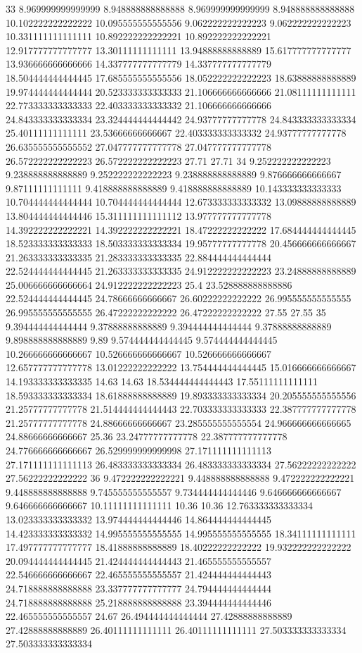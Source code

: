 33 8.969999999999999 8.948888888888888 8.969999999999999 8.948888888888888 10.102222222222222 10.095555555555556 9.062222222222223 9.062222222222223 10.331111111111111 10.892222222222221 10.892222222222221 12.917777777777777 13.30111111111111 13.94888888888889 15.617777777777777 13.936666666666666 14.337777777777779 14.337777777777779 18.504444444444445 17.685555555555556 18.052222222222223 18.63888888888889 19.974444444444444 20.523333333333333 21.106666666666666 21.08111111111111 22.773333333333333 22.403333333333332 21.106666666666666 24.843333333333334 23.324444444444442 24.93777777777778 24.843333333333334 25.40111111111111 23.53666666666667 22.403333333333332 24.93777777777778 26.635555555555552 27.047777777777778 27.047777777777778 26.572222222222223 26.572222222222223 27.71 27.71
34 9.252222222222223 9.238888888888889 9.252222222222223 9.238888888888889 9.876666666666667 9.87111111111111 9.418888888888889 9.418888888888889 10.143333333333333 10.704444444444444 10.704444444444444 12.673333333333332 13.09888888888889 13.804444444444446 15.311111111111112 13.977777777777778 14.392222222222221 14.392222222222221 18.47222222222222 17.684444444444445 18.523333333333333 18.503333333333334 19.95777777777778 20.456666666666667 21.263333333333335 21.283333333333335 22.884444444444444 22.524444444444445 21.263333333333335 24.912222222222223 23.24888888888889 25.006666666666664 24.912222222222223 25.4 23.528888888888886 22.524444444444445 24.78666666666667 26.60222222222222 26.995555555555555 26.995555555555555 26.47222222222222 26.47222222222222 27.55 27.55
35 9.394444444444444 9.37888888888889 9.394444444444444 9.37888888888889 9.898888888888889 9.89 9.574444444444445 9.574444444444445 10.266666666666667 10.526666666666667 10.526666666666667 12.657777777777778 13.01222222222222 13.754444444444445 15.016666666666667 14.193333333333335 14.63 14.63 18.534444444444443 17.55111111111111 18.593333333333334 18.61888888888889 19.893333333333334 20.205555555555556 21.25777777777778 21.514444444444443 22.703333333333333 22.387777777777778 21.25777777777778 24.88666666666667 23.285555555555554 24.966666666666665 24.88666666666667 25.36 23.24777777777778 22.387777777777778 24.776666666666667 26.529999999999998 27.171111111111113 27.171111111111113 26.483333333333334 26.483333333333334 27.56222222222222 27.56222222222222
36 9.472222222222221 9.448888888888888 9.472222222222221 9.448888888888888 9.745555555555557 9.734444444444446 9.646666666666667 9.646666666666667 10.11111111111111 10.36 10.36 12.763333333333334 13.023333333333332 13.974444444444446 14.864444444444445 14.423333333333332 14.995555555555555 14.995555555555555 18.34111111111111 17.497777777777777 18.41888888888889 18.40222222222222 19.932222222222222 20.094444444444445 21.424444444444443 21.465555555555557 22.546666666666667 22.465555555555557 21.424444444444443 24.718888888888888 23.337777777777777 24.794444444444444 24.718888888888888 25.218888888888888 23.394444444444446 22.465555555555557 24.67 26.494444444444444 27.42888888888889 27.42888888888889 26.40111111111111 26.40111111111111 27.503333333333334 27.503333333333334
